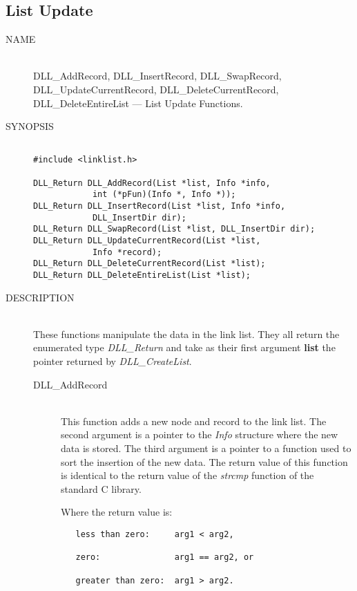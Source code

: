 \documentclass[10pt,letterpaper,titlepage]{article}
\begin{document}
\subsection{List Update}
\begin{description}
\item[NAME]\quad\\
DLL\_AddRecord, DLL\_InsertRecord, DLL\_SwapRecord,\\
DLL\_UpdateCurrentRecord, DLL\_DeleteCurrentRecord,\\
DLL\_DeleteEntireList --- List Update Functions.

\item[SYNOPSIS]
\begin{verbatim}

#include <linklist.h>

DLL_Return DLL_AddRecord(List *list, Info *info,
            int (*pFun)(Info *, Info *));
DLL_Return DLL_InsertRecord(List *list, Info *info,
            DLL_InsertDir dir);
DLL_Return DLL_SwapRecord(List *list, DLL_InsertDir dir);
DLL_Return DLL_UpdateCurrentRecord(List *list,
            Info *record);
DLL_Return DLL_DeleteCurrentRecord(List *list);
DLL_Return DLL_DeleteEntireList(List *list);
\end{verbatim}

\item[DESCRIPTION]\quad\\
These functions manipulate the data in the link list.  They all return the enumerated type \emph{DLL\_Return} and take as their first argument \textbf{list} the pointer returned by \emph{DLL\_CreateList}.

 \begin{description}
 \item[DLL\_AddRecord]\quad\\
 This function adds a new node and record to the link list.  The second argument is a pointer to the \emph{Info} structure where the new data is stored.  The third argument is a pointer to a function used to sort the insertion of the new data.  The return value of this function is identical to the return value of the \emph{strcmp} function of the standard C library.
 \vspace{8pt}

 Where the return value is:
\begin{verbatim}
   less than zero:     arg1 < arg2,

   zero:               arg1 == arg2, or

   greater than zero:  arg1 > arg2.
\end{verbatim}


\end{description}
\end{description}
\end{document}
